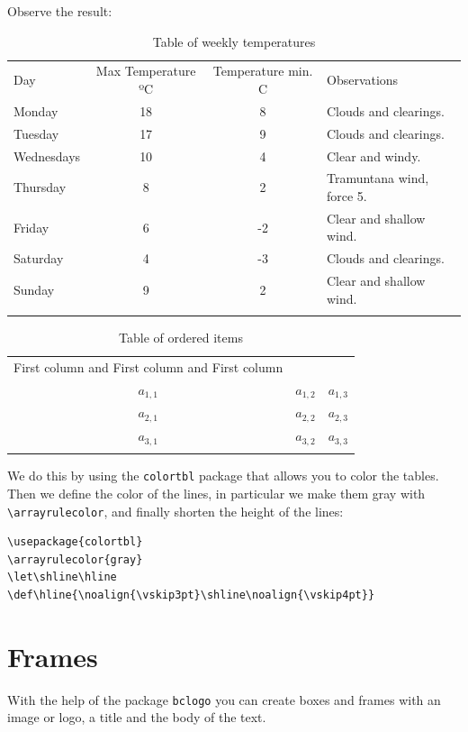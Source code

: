 \documentclass[a4paper,
                             twoside,
                             BCOR1.0cm,
                             DIV11,
                             parskip=full,
                             11pt]{scrbook}
\let\shline\hline
\def\hline{\noalign{\vskip3pt}\shline\noalign{\vskip4pt}}
\begin{document}
Observe the result:

\begin{table}[h]
\centering
\begin{tabular}{l|c|c|l}
\hline
Day & Max Temperature ºC & Temperature min. C & Observations \\
\hline
Monday & 18 & 8 & Clouds and clearings. \\
Tuesday & 17 & 9 & Clouds and clearings. \\
Wednesdays & 10 & 4 & Clear and windy. \\
Thursday & 8 & 2 & Tramuntana wind, force 5. \\
Friday & 6 & -2 & Clear and shallow wind. \\
Saturday & 4 & -3 & Clouds and clearings. \\
Sunday & 9 & 2 & Clear and shallow wind. \\
\hline
\end{tabular}
\caption{Table of weekly temperatures}\label{tab:temp}
\end{table}

\begin{table}[h]
\centering
\begin{tabular}{c|c|c}
\hline
First column and First column and First column \\
\hline
$a_{1,1}$ & $a_{1,2}$ & $a_{1,3}$ \\
$a_{2,1}$ & $a_{2,2}$ & $a_{2,3}$ \\
$a_{3,1}$ & $a_{3,2}$ & $a_{3,3}$ \\
\hline
\end{tabular}
\caption{Table of ordered items}\label{tab:ordre}
\end{table}

We do this by using the \verb+colortbl+ package that allows you to color the tables. Then we define the color of the lines, in particular we make them gray with \verb+\arrayrulecolor+, and finally shorten the height of the lines:

\begin{verbatim}
\usepackage{colortbl}
\arrayrulecolor{gray}
\let\shline\hline
\def\hline{\noalign{\vskip3pt}\shline\noalign{\vskip4pt}}
\end{verbatim}

\section{Frames}\label{sec:frames}
With the help of the package \verb+bclogo+ you can create boxes and frames with an image or logo, a title and the body of the text.
\end{document}
